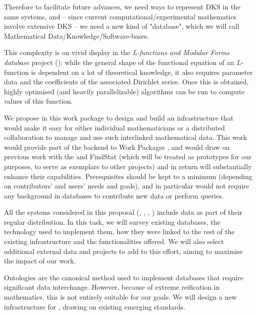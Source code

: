 \begin{workpackage}[id=dksbases,wphases=1-48!.5,
  title=Data/Knowledge/Software-Bases,lead=JU,
  ZHRM=1,JURM=36,USHRM=12,UWRM=3]
\begin{wpdescription}
Therefore to facilitate future advances, we need ways to represent DKS in the same systems, and -- since current computational/experimental mathematics involve extensive DKS -- we need a new kind of "database", which we will call Mathematical Data/Knowledge/Software-bases.

This complexity is on vivid display in the \emph{L-functions and Modular Forms database} project (\LMFDB): while the general shape of the functional equation of an $L$-function is dependent on a lot of theoretical knowledge, it also requires parameter data and the coefficients of the associated Dirichlet series. Once this is obtained, highly optimised (and heavily parallelizable) algorithms can be run to compute values of this function. 

We propose in this work package to design and build an infrastructure that would make it
easy for either individual mathematicians or a distributed collaboration to manage and use
such interlinked mathematical data. This work would provide part of the backend to Work
Packages , and would draw on previous work with
the \LMFDB and FindStat (which will be treated as prototypes for our purposes, to serve as
exemplars to other projects) and in return will substantially enhance their
capabilities. Prerequisites should be kept to a minimum (depending on contributors' and
users' needs and goals), and in particular would not require any background in databases
to contribute new data or perform queries.
\end{wpdescription}
\begin{tasklist}
\begin{task}[title=Survey of existing databases,id=data-assessment]
All the systems considered in this proposal (\GAP, \Sage, \Pari, \Singular) include data as part of their regular distribution. In this task, we will survey existing databases, the technology used to implement them, how they were linked to the rest of the existing infrastructure and the functionalities offered. We will also select additional external data and projects to add to this effort, aiming to maximise the impact of our work. 
\end{task}

\begin{task}[title={Design of new infrastructure, formulation of requirements}, id=data-design]
Ontologies are the canonical method used to implement databases that require significant data interchange. However, because of extreme reification in mathematics, this is not entirely suitable for our goals. We will design a new infrastructure for \TheProject, drawing on existing emerging standards. 


\end{task}
\end{tasklist}
\end{workpackage}

